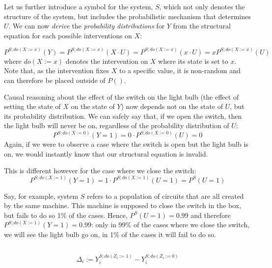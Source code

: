 \documentclass[
]{book}
\theoremstyle{definition}
\theoremstyle{definition}
\theoremstyle{definition}
\theoremstyle{remark}
\begin{document}
Let us further introduce a symbol for the system, \(S\), which not only denotes the structure of the system, but includes the probabilistic mechanism that determines \(U\). We can now \emph{derive} the \emph{probability distributions} for \(Y\) from the structural equation for each possible interventions on \(X\):

\begin{equation}
P^{S;do(X:=x)}(Y) = P^{S;do(X:=x)}(X \cdot U) = P^{S;do(X:=x)}(x \cdot U) = x P^{S;do(X:=x)}(U)
\end{equation}
where \(do(X:=x)\) denotes the intervention on \(X\) where its state is set to \(x\). Note that, as the intervention fixes \(X\) to a specific value, it is non-random and can therefore be placed outside of \(P()\).

Causal reasoning about the effect of the switch on the light bulb (the effect of setting the state of \(X\) on the state of \(Y\)) now depends not on the state of \(U\), but its probability distribution. We can safely say that, if we open the switch, then the light bulb will never be on, regardless of the probability distribution of \(U\):
\begin{equation}
P^{S;do(X:=0)}(Y=1) = 0 \cdot P^{S;do(X:=0)}(U) = 0
\end{equation}
Again, if we were to observe a case where the switch is open but the light bulb is on, we would instantly know that our structural equation is invalid.

This is different however for the case where we close the switch:
\begin{equation}
P^{S;do(X:=1)}(Y=1) = 1 \cdot P^{S;do(X:=1)}(U=1) = P^{S}(U=1)
\end{equation}

Say, for example, system \(S\) refers to a population of circuits that are all created by the same machine. This machine is supposed to close the switch in the box, but fails to do so 1\% of the cases. Hence, \(P^{S}(U=1)=0.99\) and therefore \(P^{S;do(X:=1)}(Y=1)=0.99\): only in 99\% of the cases where we close the switch, we will see the light bulb go on, in 1\% of the cases it will fail to do so.

\hypertarget{section}{%
\subsection{}\label{section}}

\begin{equation}
\Delta_i := Y_i^{S;do(Z_i:=1)} - Y_i^{S; do(Z_i:=0)} \label{eq:myfirsteq} \tag{1}
\end{equation}
\end{document}
